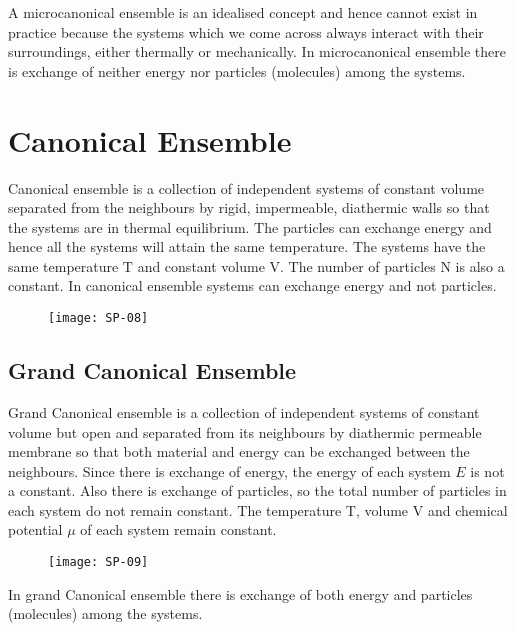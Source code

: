 A microcanonical ensemble is an idealised concept and hence cannot exist in practice because the systems which we come across always interact with their surroundings, either thermally or mechanically.
In microcanonical ensemble there is exchange of neither energy nor particles (molecules) among the systems.
\section{Canonical Ensemble}
Canonical ensemble is a collection of independent systems of constant volume separated from the neighbours by rigid, impermeable, diathermic walls so that the systems are in thermal equilibrium. The particles can exchange energy and hence all the systems will attain the same temperature. The systems have the same temperature $\mathrm{T}$ and constant volume $\mathrm{V}$. The number of particles $\mathrm{N}$ is also a constant. In canonical ensemble systems can exchange energy and not particles. 
\begin{figure}[H]
	\centering
	\texttt{[image: SP-08]}
\end{figure}
\subsection{Grand Canonical Ensemble}
Grand Canonical ensemble is a collection of independent systems of constant volume but open and separated from its neighbours by diathermic permeable membrane so that both material and energy can be exchanged between the neighbours. Since there is exchange of energy, the energy of each system $E$ is not a constant. Also there is exchange of particles, so the total number of particles in each system do not remain constant. The temperature T, volume $\mathrm{V}$ and chemical potential $\mu$ of each system remain constant. 
\begin{figure}[H]
	\centering
	\texttt{[image: SP-09]}
\end{figure}
In grand Canonical ensemble there is exchange of both energy and particles (molecules) among the systems.
